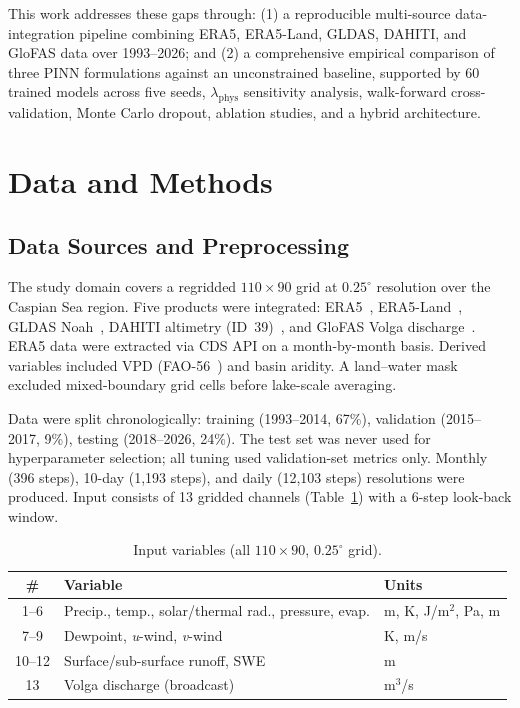 \documentclass[conference,a4paper]{IEEEtran}
\begin{document}
This work addresses these gaps through: (1) a reproducible multi-source data-integration pipeline combining ERA5, ERA5-Land, GLDAS, DAHITI, and GloFAS data over 1993--2026; and (2) a comprehensive empirical comparison of three PINN formulations against an unconstrained baseline, supported by 60 trained models across five seeds, $\lambda_{\text{phys}}$ sensitivity analysis, walk-forward cross-validation, Monte Carlo dropout, ablation studies, and a hybrid architecture.

\section{Data and Methods}

\subsection{Data Sources and Preprocessing}

The study domain covers a regridded $110 \times 90$ grid at $0.25^\circ$ resolution over the Caspian Sea region. Five products were integrated: ERA5~\cite{hersbach2020era5}, ERA5-Land~\cite{munoz2021eraland}, GLDAS Noah~\cite{rodell2004gldas}, DAHITI altimetry (ID~39)~\cite{schwatke2015dahiti}, and GloFAS Volga discharge~\cite{grimaldi2022glofas}. ERA5 data were extracted via CDS API on a month-by-month basis. Derived variables included VPD (FAO-56~\cite{allen1998fao}) and basin aridity. A land--water mask excluded mixed-boundary grid cells before lake-scale averaging.

Data were split chronologically: training (1993--2014, 67\%), validation (2015--2017, 9\%), testing (2018--2026, 24\%). The test set was never used for hyperparameter selection; all tuning used validation-set metrics only. Monthly (396 steps), 10-day (1,193 steps), and daily (12,103 steps) resolutions were produced. Input consists of 13 gridded channels (Table~\ref{tab:input}) with a 6-step look-back window.

\begin{table}[htbp]
\centering
\caption{Input variables (all $110{\times}90$, $0.25^\circ$ grid).}
\label{tab:input}
\footnotesize
\setlength{\tabcolsep}{3pt}
\begin{tabular}{c>{\raggedright\arraybackslash}p{3.8cm}>{\raggedright\arraybackslash}p{2.6cm}}
\toprule
\# & Variable & Units \\
\midrule
1--6 & Precip., temp., solar/thermal rad., pressure, evap. & m, K, J/m$^2$, Pa, m \\
7--9 & Dewpoint, \textit{u}-wind, \textit{v}-wind & K, m/s \\
10--12 & Surface/sub-surface runoff, SWE & m \\
13 & Volga discharge (broadcast) & m$^3$/s \\
\bottomrule
\end{tabular}
\end{table}
\end{document}
